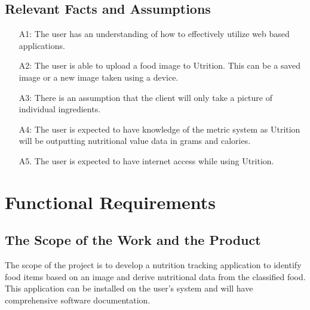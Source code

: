 \documentclass[12pt]{article}
\begin{document}
\subsection{Relevant Facts and Assumptions } 

\begin{itemize}
	
	\item [A1:] The user has an understanding of how to effectively utilize web based applications.
	
	\item [A2:] The user is able to upload a food image to Utrition. This can be a saved image or a new image taken using a device.
	
	\item [A3:] There is an assumption that the client will only take a picture of individual ingredients. 

	\item [A4:] The user is expected to have knowledge of the metric system as Utrition will be outputting nutritional value data in grams and calories.
	
	\item [A5.] The user is expected to have internet access while using Utrition.

\end{itemize}

\section{Functional Requirements}

\subsection{The Scope of the Work and the Product}

The scope of the project is to develop a nutrition tracking application to identify food items based on an image and derive nutritional data from the classified food. This application can be installed on the user's system and will have comprehensive software documentation.
\end{document}
